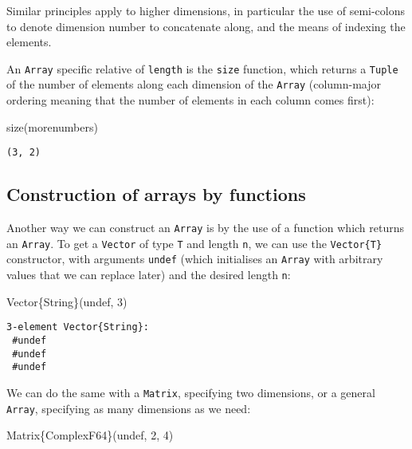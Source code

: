 \documentclass[
  letterpaper,
  DIV=11,
  numbers=noendperiod]{scrreprt}
\newenvironment{Shaded}{\begin{snugshade}}{\end{snugshade}}
\newcommand{\ConstantTok}[1]{\textcolor[rgb]{0.56,0.35,0.01}{#1}}
\newcommand{\DataTypeTok}[1]{\textcolor[rgb]{0.68,0.00,0.00}{#1}}
\newcommand{\FloatTok}[1]{\textcolor[rgb]{0.68,0.00,0.00}{#1}}
\newcommand{\FunctionTok}[1]{\textcolor[rgb]{0.28,0.35,0.67}{#1}}
\newcommand{\NormalTok}[1]{\textcolor[rgb]{0.00,0.23,0.31}{#1}}
\begin{document}
Similar principles apply to higher dimensions, in particular the use of
semi-colons to denote dimension number to concatenate along, and the
means of indexing the elements.

An \texttt{Array} specific relative of \texttt{length} is the
\texttt{size} function, which returns a \texttt{Tuple} of the number of
elements along each dimension of the \texttt{Array} (column-major
ordering meaning that the number of elements in each column comes
first):

\begin{Shaded}
\begin{Highlighting}[]
\FunctionTok{size}\NormalTok{(morenumbers)}
\end{Highlighting}
\end{Shaded}

\begin{verbatim}
(3, 2)
\end{verbatim}

\hypertarget{construction-of-arrays-by-functions}{%
\subsection{Construction of arrays by
functions}\label{construction-of-arrays-by-functions}}

Another way we can construct an \texttt{Array} is by the use of a
function which returns an \texttt{Array}. To get a \texttt{Vector} of
type \texttt{T} and length \texttt{n}, we can use the
\texttt{Vector\{T\}} constructor, with arguments \texttt{undef} (which
initialises an \texttt{Array} with arbitrary values that we can replace
later) and the desired length \texttt{n}:

\begin{Shaded}
\begin{Highlighting}[]
\FunctionTok{Vector}\DataTypeTok{\{String\}}\NormalTok{(}\ConstantTok{undef}\NormalTok{, }\FloatTok{3}\NormalTok{)}
\end{Highlighting}
\end{Shaded}

\begin{verbatim}
3-element Vector{String}:
 #undef
 #undef
 #undef
\end{verbatim}

We can do the same with a \texttt{Matrix}, specifying two dimensions, or
a general \texttt{Array}, specifying as many dimensions as we need:

\begin{Shaded}
\begin{Highlighting}[]
\FunctionTok{Matrix}\DataTypeTok{\{ComplexF64\}}\NormalTok{(}\ConstantTok{undef}\NormalTok{, }\FloatTok{2}\NormalTok{, }\FloatTok{4}\NormalTok{)}
\end{Highlighting}
\end{Shaded}
\end{document}
